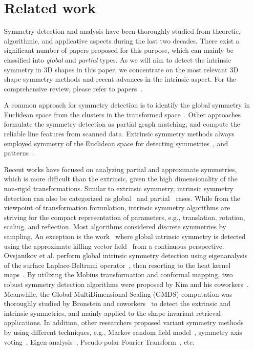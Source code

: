\section{Related work}
\label{sec:related}

Symmetry detection and analysis have been thoroughly studied from theoretic, algorithmic, and applicative aspects during the last two decades.
There exist a significant number of papers proposed for this purpose, which can mainly be classified into \emph{global} and \emph{partial} types.
As we will aim to detect the intrinsic symmetry in 3D shapes in this paper, we concentrate on the most relevant 3D shape symmetry methods and recent advances in the intrinsic aspect.
For the comprehensive review, please refer to papers~\cite{xu2009,berner2011}.

A common approach for symmetry detection is to identify the global symmetry in Euclidean space from the clusters in the transformed space~\cite{mitra2006,podolak2006,pauly2008}. Other approaches~\cite{bokeloh2009,berner2011} formulate the symmetry detection as partial graph matching, and compute the reliable line features from scanned data.
Extrinsic symmetry methods always employed symmetry of the Euclidean space for detecting symmetries~\cite{zabrodsky1997,mitra2006,podolak2006},
and patterns~\cite{pauly2008,bokeloh2009,yeh2009,berner2011}.

Recent works have focused on analyzing partial and approximate symmetries, which is more difficult than the extrinsic, given the high dimensionality of the non-rigid transformations.
Similar to extrinsic symmetry, intrinsic symmetry detection can also be categorized as global~\cite{ovsjanikov2008,bronstein2009,ben-chen2010,bokeloh2010,chertok2010,lipman2010,kim2010,hooda2011,kim2011} and partial~\cite{lasowski2009,xu2009,mitra2010,raviv2010,bronstein2011} cases. While from the viewpoint of transformation formulation, intrinsic symmetry algorithms are striving for the compact representation of parameters, e.g., translation, rotation, scaling, and reflection. Most algorithms considered discrete symmetries by sampling. An exception is the work~\cite{ben-chen2010}
where global intrinsic symmetry is detected using the approximate killing vector field~\cite{ben-chen2010} from a continuous perspective.
Ovsjanikov et al. perform global intrinsic symmetry detection using eigenanalysis of the surface Laplace-Beltrami operator~\cite{ovsjanikov2008}, then resorting to the heat kernel maps~\cite{ovsjanikov2010}. By utilizing the Mobius transformation and conformal mapping, two robust symmetry detection algorithms were proposed by Kim and his coworkers~\cite{kim2010,kim2011}. Meanwhile, the Global MultiDimensional Scaling (GMDS) computation was thoroughly studied by Bronstein and coworkers~\cite{bronstein2006,bronstein2009,raviv2010,bronstein2011} to detect the extrinsic and intrinsic symmetries, and mainly applied to the shape invariant retrieval applications. In addition, other researchers proposed variant symmetry methods by using different techniques, e.g., Markov random field model~\cite{lasowski2009}, symmetry axis voting~\cite{xu2009}, Eigen analysis~\cite{chertok2010,lipman2010}, Pseudo-polar Fourier Transform~\cite{bermanis2010}, etc.

